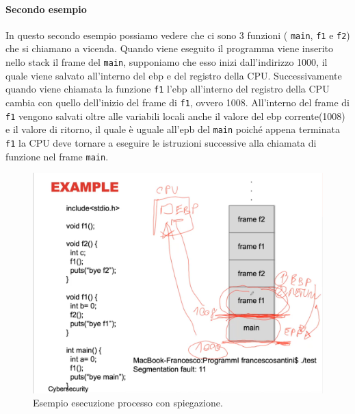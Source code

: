 \paragraph{Secondo esempio}
In questo secondo esempio possiamo vedere che ci sono 3 funzioni ( \verb|main|, \verb|f1| e \verb|f2|) che si chiamano a vicenda. Quando viene eseguito il programma viene inserito nello stack il frame del \verb|main|, supponiamo che esso inizi dall'indirizzo 1000, il quale viene salvato all'interno del ebp e del registro della CPU. Successivamente quando viene chiamata la funzione \verb|f1| l'ebp all'interno del registro della CPU cambia con quello dell'inizio del frame di \verb|f1|, ovvero 1008. All'interno del frame di \verb|f1| vengono salvati oltre alle variabili locali anche il valore del ebp corrente(1008) e il valore di ritorno, il quale è uguale all'epb del \verb|main| poiché appena terminata \verb|f1| la CPU deve tornare a eseguire le istruzioni successive alla chiamata di funzione nel frame \verb|main|.
\begin{figure}[H]
	\centering
    \includegraphics[width=13cm, keepaspectratio]{santini/img/cap_2/es_process_spiegato.png}
	\caption{Esempio esecuzione processo con spiegazione.}\label{fig:es_esec_processo2}
\end{figure}

